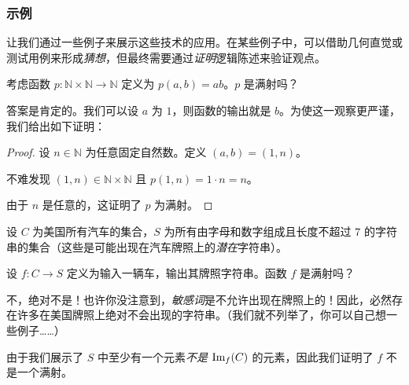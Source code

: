 \subsubsection*{示例}

让我们通过一些例子来展示这些技术的应用。在某些例子中，可以借助几何直觉或测试用例来形成\emph{猜想}，但最终需要通过\emph{证明}逻辑陈述来验证观点。

\begin{example}
    考虑函数 $p : \mathbb{N} \times \mathbb{N} \to \mathbb{N}$ 定义为 $p(a,b) = ab$。$p$ 是满射吗？

    答案是肯定的。我们可以设 $a$ 为 $1$，则函数的输出就是 $b$。为使这一观察更严谨，我们给出如下证明：

    \begin{proof}
        设 $n \in \mathbb{N}$ 为任意固定自然数。定义 $(a, b) = (1, n)$。

        不难发现 $(1, n) \in \mathbb{N} \times \mathbb{N}$ 且 $p(1, n) = 1 \cdot n = n$。

        由于 $n$ 是任意的，这证明了 $p$ 为满射。
    \end{proof}
\end{example}

\begin{example}
    设 $C$ 为美国所有汽车的集合，$S$ 为所有由字母和数字组成且长度不超过 $7$ 的字符串的集合（这些是可能出现在汽车牌照上的\emph{潜在}字符串）。

    设 $f : C \to S$ 定义为输入一辆车，输出其牌照字符串。函数 $f$ 是满射吗？

    不，绝对不是！也许你没注意到，\emph{敏感词}是不允许出现在牌照上的！因此，必然存在许多在美国牌照上绝对不会出现的字符串。（我们就不列举了，你可以自己想一些例子……）

    由于我们展示了 $S$ 中至少有一个元素\emph{不是} $\text{Im}_f (C)$ 的元素，因此我们证明了 $f$ 不是一个满射。
\end{example}

